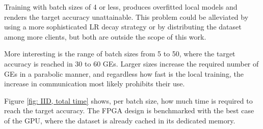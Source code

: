 Training with batch sizes of 4 or less, produces overfitted local models and renders the target accuracy unattainable. This problem could be alleviated by using a more sophisticated LR decay strategy or by distributing the dataset among more clients, but both are outside the scope of this work. %

More interesting is the range of batch sizes from 5 to 50, where the target accuracy is reached in 30 to 60 GEs. Larger sizes increase the required number of GEs in a parabolic manner, and regardless how fast is the local training, the increase in communication most likely prohibits their use.

Figure \ref{fig: IID, total time} shows, per batch size, how much time is required to reach the target accuracy. The FPGA design is benchmarked with the best case of the GPU, where the dataset is already cached in its dedicated memory.  %
